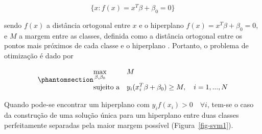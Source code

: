 \begin{apendicesenv}
\[
\{x: f(x) = x^T\beta + \beta_0 = 0\}
\]

\noindent sendo \(f(x)\) a distância ortogonal entre \(x\) e o
hiperplano \(f(x) = x^T\beta + \beta_0 = 0\), e \(M\) a margem entre as
classes, definida como a distância ortogonal entre os pontos mais
próximos de cada classe e o hiperplano \autocite{hastie_elements_2009}.
Portanto, o problema de otimização é dado por

\begin{equation}\phantomsection\label{eq-svm}{
\begin{aligned}
& \underset{\beta, \beta_0}{\text{max}}
& & M \\
& \text{sujeito a}
& & y_i(x_i^T\beta + \beta_0) \geq M, \quad i = 1, ..., N
\end{aligned}
}\end{equation}

Quando pode-se encontrar um hiperplano com
\(y_if(x_i) > 0 \quad \forall i\), tem-se o caso da construção de uma
solução única para um hiperplano entre duas classes perfeitamente
separadas pela maior margem possível (Figura~\ref{fig-svm1}).

\begin{figure}

\begin{minipage}{\linewidth}



\end{minipage}%
\newline
\begin{minipage}{\linewidth}

\end{minipage}
\end{figure}
\end{apendicesenv}
